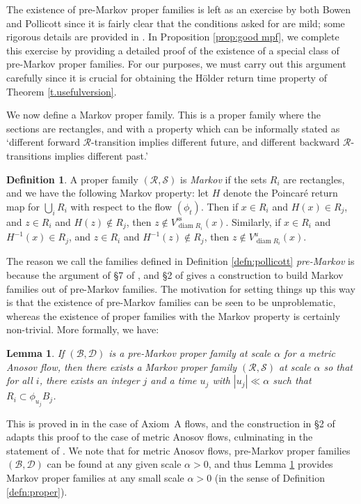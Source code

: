 \documentclass[11pt]{article}
\let\mathcal\mathscr
\newcommand{\sts}{\mathrm{ss}}
\newtheorem{lem}[thm]{Lemma}
\theoremstyle{definition}
\newtheorem{defn}[thm]{Definition}
\numberwithin{equation}{section}
\DeclareMathOperator{\diam}{diam}
\newcommand\DDD{\mathcal D}
\newcommand\BBB{\mathcal B}
\newcommand\RRR{\mathcal R}
\newcommand\SSS{\mathcal S}
\begin{document}
The existence of pre-Markov proper families is left as an exercise by both Bowen and Pollicott since it is fairly clear that the conditions asked for are mild; some rigorous details are provided in \cite{BW}. In Proposition \ref{prop:good mpf}, we complete this exercise by providing a detailed proof of the existence of a special class of pre-Markov proper families. For our purposes, we must carry out this argument carefully since it is crucial for obtaining the Hölder return time property of Theorem \ref{t.usefulversion}.

We now define a Markov proper family. This is a proper family where the sections are rectangles, and with a property which can be informally stated as `different forward $\RRR$-transition implies different future, and different backward $\RRR$-transitions implies different past.'

\begin{defn}
A proper family $(\RRR, \SSS)$ is \emph{Markov} if the sets $R_i$ are rectangles, and we have the following Markov property: let $H$ denote the Poincaré return map for $\bigcup_i R_i$ with respect to the flow $(\phi_t)$. Then if $ x \in R_i$ and $ H(x) \in R_j$, and $z \in R_i$ and $H(z) \notin R_j$, then $z \notin V^{\sts}_{\diam R_i}(x)$. Similarly, if $ x \in R_i$ and $ H^{-1}(x) \in R_j$, and $z \in R_i$ and $H^{-1}(z) \notin R_j$, then $z \notin V^u_{\diam R_i}(x)$.
\end{defn}

The reason we call the families defined in Definition \ref{defn:pollicott} \emph{pre-Markov} is because the argument of \S7 of \cite{bowen-symbolic}, and \S2 of \cite{pollicott} gives a construction to build Markov families out of pre-Markov families. The motivation for setting things up this way is that the existence of pre-Markov families can be seen to be unproblematic, whereas the existence of proper families with the Markov property is certainly non-trivial. More formally, we have:

\begin{lem} \label{PtoB}
If $(\BBB, \DDD)$ is a pre-Markov proper family at scale $\alpha$ for a metric Anosov flow, then there exists a Markov proper family $(\RRR, \SSS)$ at scale $\alpha$ so that for all $i$, there exists an integer $j$ and a time $u_j$ with $|u_j|\ll \alpha$ such that $R_i \subset \phi_{u_j}B_j$.
\end{lem}

This is proved in \cite[\S7]{bowen-symbolic} in the case of Axiom~A flows, and the construction in \S2 of \cite{pollicott} adapts this proof to the case of metric Anosov flows, culminating in the statement of \cite[\S 2.2 `Key Lemma']{pollicott}. We note that for metric Anosov flows, pre-Markov proper families $(\BBB, \DDD)$ can be found at any given scale $\alpha>0$, and thus Lemma \ref{PtoB} provides Markov proper families at any small scale $\alpha>0$ (in the sense of Definition \ref{defn:proper}).
\end{document}
